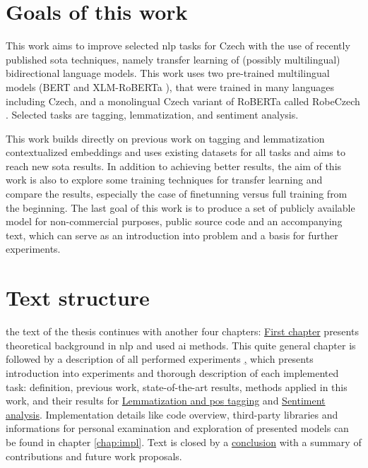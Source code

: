 \section*{Goals of this work}
This work aims to improve selected \acrfull{nlp} tasks for Czech with the use of recently published \acrlong{sota} techniques, namely transfer learning of (possibly multilingual) bidirectional language models. This work uses two pre-trained multilingual models (BERT\citep{Devlin2019} and XLM-RoBERTa \citep{Conneau2019}), that were trained in many languages including Czech, and a monolingual Czech variant of RoBERTa called RobeCzech \citep{Straka2021}. Selected tasks are tagging, lemmatization, and sentiment analysis.\par This work builds directly on previous work on tagging and lemmatization contextualized embeddings \citep{straka2019czech} and uses existing datasets for all tasks and aims to reach new \acrfull{sota} results. In addition to achieving better results, the aim of this work is also to explore some training techniques for transfer learning and compare the results, especially the case of finetunning versus full training from the beginning.  The last goal of this work is to produce a set of publicly available model for non-commercial purposes, public source code and an accompanying text, which can serve as an introduction into problem and a basis for further experiments.
\section*{Text structure}
the text of the thesis continues with another four chapters: \hyperref[chap:theandme]{First chapter} presents theoretical background in \acrshort{nlp} and used \acrfull{ai} methods. This quite general chapter is followed by a description of all performed experiments \hyperref[chap:exp], which presents introduction into experiments and thorough description of each implemented task: definition, previous work, state-of-the-art results, methods applied in this work, and their results for \hyperref[chap:tag]{Lemmatization and \acrlong{pos} tagging} and  \hyperref[chap:sent]{Sentiment analysis}. Implementation details like code overview, third-party libraries and informations for personal examination and exploration of presented models can be found in chapter \ref{chap:impl}. Text is closed by a \hyperref[chap:concl]{conclusion} with a summary of contributions and future work proposals.

